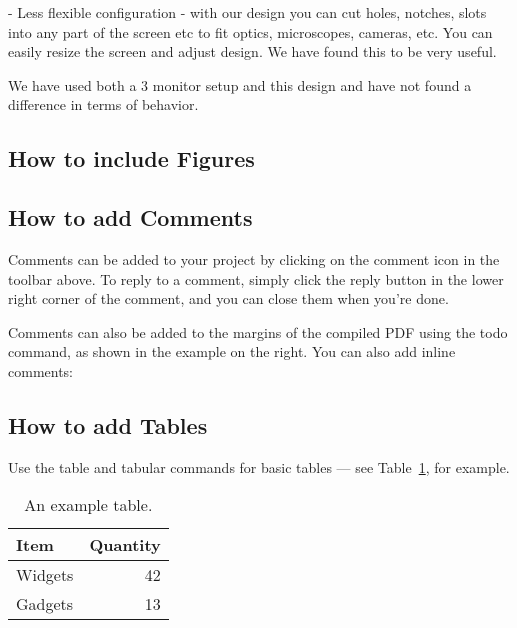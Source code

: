 \documentclass[letter]{article}
\begin{document}
- Less flexible configuration - with our design you can cut holes, notches, slots into any part of the screen etc to fit optics, microscopes, cameras, etc. You can easily resize the screen and adjust design. We have found this to be very useful.

We have used both a 3 monitor setup and this design and have not found a difference in terms of behavior.

\subsection{How to include Figures}


\subsection{How to add Comments}

Comments can be added to your project by clicking on the comment icon in the toolbar above. %
%
%
To reply to a comment, simply click the reply button in the lower right corner of the comment, and you can close them when you're done.

Comments can also be added to the margins of the compiled PDF using the todo command, as shown in the example on the right. You can also add inline comments:


\subsection{How to add Tables}

Use the table and tabular commands for basic tables --- see Table~\ref{tab:widgets}, for example. 

\begin{table}
\centering
\begin{tabular}{l|r}
Item & Quantity \\\hline
Widgets & 42 \\
Gadgets & 13
\end{tabular}
\caption{\label{tab:widgets}An example table.}
\end{table}
\end{document}
